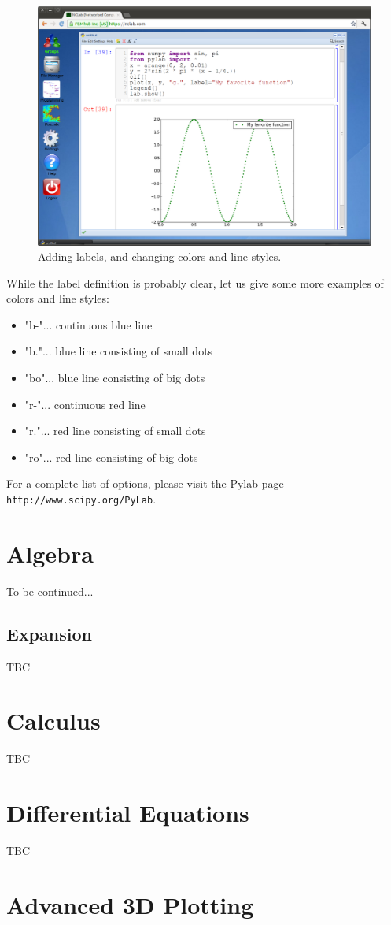 \documentclass[article,A4,12pt]{llncs}
\begin{document}
\begin{figure}[!ht]
\begin{center}
\includegraphics[width=\textwidth]{img/plot2.png}
\end{center}
\vspace{-2mm}
\caption{Adding labels, and changing colors and line styles.}
\label{fig:plot2}
\end{figure}
\noindent
While the label definition is probably clear, let us give some more examples 
of colors and line styles:

\begin{itemize}
\item "b-"... continuous blue line
\item "b."... blue line consisting of small dots
\item "bo"... blue line consisting of big dots
\item "r-"... continuous red line
\item "r."... red line consisting of small dots
\item "ro"... red line consisting of big dots
\end{itemize}
For a complete list of options, please visit the Pylab page {\tt http://www.scipy.org/PyLab}.



\section{Algebra}

To be continued...

\subsection{Expansion}

TBC

\section{Calculus}

TBC



\section{Differential Equations}

TBC


\section{Advanced 3D Plotting}
\end{document}
